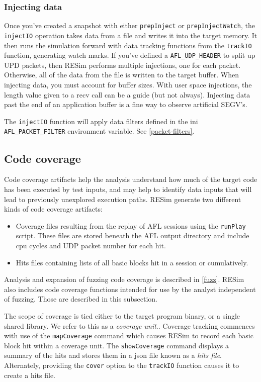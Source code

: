 \documentclass[titlepage]{article}
\begin{document}
\subsubsection{Injecting data}
\label{injecting-data}
Once you've created a snapshot with either {\tt prepInject} or {\tt prepInjectWatch}, the {\tt injectIO} operation takes data from a file and writes it into the 
target memory. It then runs the simulation forward with data tracking functions from the {\tt trackIO} function, generating watch marks.  
If you've defined a {\tt AFL\_UDP\_HEADER} to split up
UPD packets, then RESim performs multiple injections, one for each packet.  Otherwise, all of the data from the file is written to the target buffer.
When injecting data, you must account for buffer sizes.  With user space injections, the length value
given to a recv call can be a guide (but not always).  Injecting data past the end of an application buffer is a fine way to observe artificial SEGV's.

The {\tt injectIO} function will apply data filters defined in the ini {\tt AFL\_PACKET\_FILTER} environment variable.  See \ref{packet-filters}.

\subsection{Code coverage}
\label{coverage}
Code coverage artifacts help the analysis understand how much of the target code has been executed by test inputs, and may help to identify data inputs
that will lead to previously unexplored execution paths.
RESim generate two different kinds of code coverage artifacts:
\begin{itemize}
\item Coverage files resulting from the replay of AFL sessions using the {\tt runPlay} script.  These files are stored beneath the AFL output directory
and include cpu cycles and UDP packet number for each hit. 
\item Hits files containing lists of all basic blocks hit in a session or cumulatively.
\end{itemize}

Analysis and expansion of fuzzing code coverage is described in \ref{fuzz}.  RESim also includes code coverage functions intended for use
by the analyst independent of fuzzing.  Those are described in this subsection.  

The scope of coverage is tied either to the target program binary, or a single shared library.  We refer to this as a \textit{coverage unit}..  
Coverage tracking commences with use of the {\tt mapCoverage} command which causes RESim to record each basic block hit within a coverage unit.
The {\tt showCoverage} command displays a summary of the hits and stores them in a json file known as a \textit {hits file}.  
Alternately, providing the {\tt cover} option to the {\tt trackIO} function causes it to create a hits file.
\end{document}
